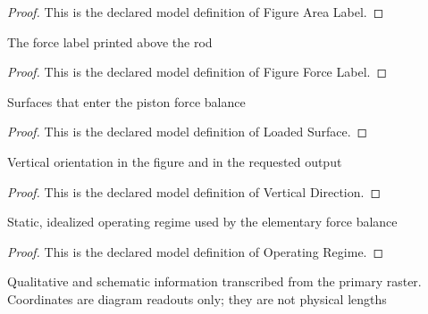 \begin{proof}
  This is the declared model definition of Figure Area Label.
\end{proof}
\begin{definition}
  \label{def:physics:phyx-mini-0381:phyxminiproblems-problemphyxmini0381-figureforcelabel}
  The force label printed above the rod
\end{definition}
\begin{proof}
  This is the declared model definition of Figure Force Label.
\end{proof}
\begin{definition}
  \label{def:physics:phyx-mini-0381:phyxminiproblems-problemphyxmini0381-loadedsurface}
  Surfaces that enter the piston force balance
\end{definition}
\begin{proof}
  This is the declared model definition of Loaded Surface.
\end{proof}
\begin{definition}
  \label{def:physics:phyx-mini-0381:phyxminiproblems-problemphyxmini0381-verticaldirection}
  Vertical orientation in the figure and in the requested output
\end{definition}
\begin{proof}
  This is the declared model definition of Vertical Direction.
\end{proof}
\begin{definition}
  \label{def:physics:phyx-mini-0381:phyxminiproblems-problemphyxmini0381-operatingregime}
  Static, idealized operating regime used by the elementary force balance
\end{definition}
\begin{proof}
  This is the declared model definition of Operating Regime.
\end{proof}
\begin{definition}
  \label{def:physics:phyx-mini-0381:phyxminiproblems-problemphyxmini0381-suppliedhydraulicpistonfigure}
  Qualitative and schematic information transcribed from the primary raster. Coordinates are diagram readouts only; they are not physical lengths
\end{definition}
